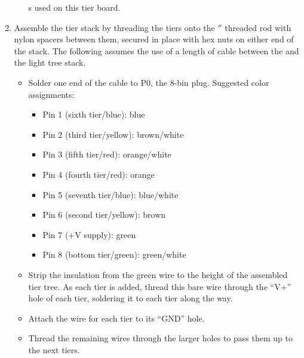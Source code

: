 \begin{enumerate}
\begin{itemize}
				\led s used on this tier board.
		\end{itemize}
	\item Assemble the tier stack by threading the tiers onto the $''$ threaded rod with nylon spacers between them,
		secured in place with hex nuts on either end of the stack. The following assumes the use of a length of 
		cable between the  and the light tree stack.
		\begin{itemize}
			\item Solder one end of the cable to P0, the 8-bin  plug. Suggested color assignments:
				\begin{itemize}
					\item Pin 1 (sixth tier/blue): blue	
					\item Pin 2 (third tier/yellow): brown/white
					\item Pin 3 (fifth tier/red): orange/white
					\item Pin 4 (fourth tier/red): orange
					\item Pin 5 (seventh tier/blue): blue/white
					\item Pin 6 (second tier/yellow): brown
					\item Pin 7 (+V supply): green
					\item Pin 8 (bottom tier/green): green/white
				\end{itemize}
			\item Strip the insulation from the green wire to the height of the assembled tier tree.
				As each tier is added, thread this bare wire through the ``V+'' hole of each tier, soldering it to
				each tier along the way.
			\item Attach the wire for each tier to its ``GND'' hole.
			\item Thread the remaining wires through the larger holes to pass them up to the next tiers.
		\end{itemize}
\end{enumerate}


                                                      
%
